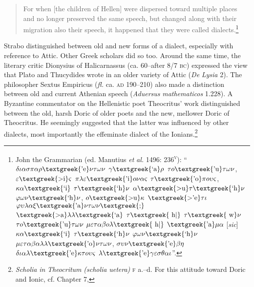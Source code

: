 \begin{quote}
For when [the children of Hellen] were dispersed toward multiple places and no longer preserved the same speech, but changed along with their migration also their speech, it happened that they were called dialects.\footnote{John the Grammarian (ed. Manutius \textit{et} \textit{al.} 1496: 236\textsc{\textsuperscript{v}}): “$\delta \iota \alpha \sigma \pi \alpha \rho \text{\textgreek{'e}}\nu \tau \omega \nu $ $\gamma \text{\textgreek{`a}}\rho $ $\tau o\text{\textgreek{'u}}\tau \omega \nu $, $\varepsilon \text{\textgreek{>i}}\varsigma $ $\pi \lambda \varepsilon \text{\textgreek{'i}}o\nu \alpha \varsigma $ $\tau \text{\textgreek{'o}}\pi o\upsilon \varsigma $, $\kappa \alpha \text{\textgreek{`i}}$ $\tau \text{\textgreek{`h}}\nu $ $\alpha \text{\textgreek{>u}}\tau \text{\textgreek{`h}}\nu $ $\varphi \omega \nu \text{\textgreek{`h}}\nu $, $o\text{\textgreek{>u}}\kappa $ $\text{\textgreek{>'e}}\tau \iota $ $\varphi \upsilon \lambda \alpha \xi \text{\textgreek{'a}}\nu \tau \omega \nu \text{\textgreek{;}}$ $\text{\textgreek{>a}}\lambda \lambda \text{\textgreek{`a}}$ $\tau \text{\textgreek{~h|}}$ $\tau \text{\textgreek{~w}}\nu $ $\tau o\text{\textgreek{'u}}\tau \omega \nu $ $\mu \varepsilon \tau \alpha \beta o\lambda \text{\textgreek{~h|}}$ $\text{\textgreek{'a}}\mu \alpha $ [\textit{sic}] $\kappa \alpha \text{\textgreek{`i}}$ $\tau \text{\textgreek{`h}}\nu $ $\varphi \omega \nu \text{\textgreek{`h}}\nu $ $\mu \varepsilon \tau \alpha \beta \alpha \lambda \lambda \text{\textgreek{'o}}\nu \tau \omega \nu $, $\sigma \upsilon \nu \text{\textgreek{'e}}\beta \eta $ $\delta \iota \alpha \lambda \text{\textgreek{'e}}\kappa \tau o\upsilon \varsigma $ $\lambda \text{\textgreek{'e}}\gamma \varepsilon \sigma \theta \alpha \iota $”.}
\end{quote}

Strabo distinguished between old and new forms of a dialect, especially with reference to Attic. Other Greek scholars did so too. Around the same time, the literary critic Dionysius of Halicarnassus (ca. 60–after 8/7 \textsc{bc}) expressed the view that Plato and Thucydides wrote in an older variety of Attic (\textit{De} \textit{Lysia} 2). The philosopher Sextus Empiricus (\textit{fl.} ca. \textsc{ad} 190–210) also made a distinction between old and current Athenian speech (\textit{Aduersus} \textit{mathematicos} 1.228). A Byzantine commentator on the Hellenistic poet Theocritus’ work distinguished between the old, harsh Doric of older poets and the new, mellower Doric of Theocritus. He seemingly suggested that the latter was influenced by other dialects, most importantly the effeminate dialect of the Ionians.\footnote{\textit{Scholia} \textit{in} \textit{Theocritum} \textit{(scholia} \textit{uetera)} \textsc{f} a.–d. For this attitude toward Doric and Ionic, cf. Chapter 7, }

